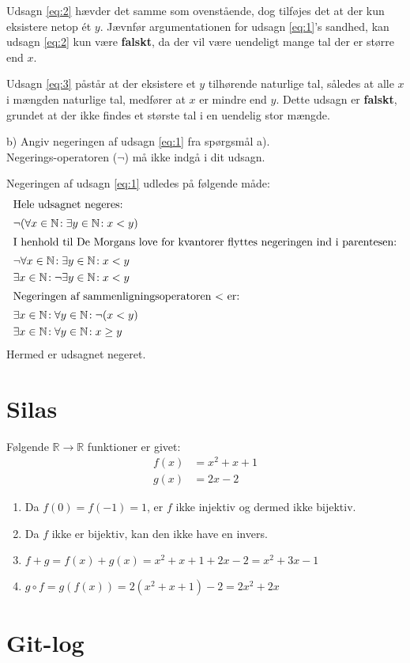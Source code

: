 \documentclass[12pt, a4paper]{article}
\begin{document}
Udsagn \eqref{eq:2} hævder det samme som ovenstående, dog tilføjes det at der kun eksistere netop ét \(y\). Jævnfør argumentationen for udsagn \eqref{eq:1}'s sandhed, kan udsagn \eqref{eq:2} kun være \textbf{falskt}, da der vil være uendeligt mange tal der er større end \(x\).

Udsagn \eqref{eq:3} påstår at der eksistere et \(y\) tilhørende naturlige tal, således at alle \(x\) i mængden naturlige tal, medfører at \(x\) er mindre end \(y\). Dette udsagn er \textbf{falskt}, grundet at der ikke findes et største tal i en uendelig stor mængde.
\begin{tcolorbox}
b) Angiv negeringen af udsagn \eqref{eq:1} fra spørgsmål a).\\ Negerings-operatoren (\(\neg\)) må ikke indgå i dit udsagn.
\end{tcolorbox}\vspace{-5pt}
Negeringen af udsagn \eqref{eq:1} udledes på følgende måde:\vspace{-5pt}
\begin{align}
\intertext{Hele udsagnet negeres:}
	&\neg(\forall x \in \mathbb{N}\! : \exists y \in \mathbb{N}\! : x < y)\\
\intertext{I henhold til De Morgans love for kvantorer flyttes negeringen ind i parentesen:}
	&\neg\forall x \in \mathbb{N}\! : \exists y \in \mathbb{N}\! : x < y\\
	&\exists x \in \mathbb{N}\! : \neg\exists y \in \mathbb{N}\! : x < y\\
\intertext{Negeringen af sammenligningsoperatoren $<$ er:}
	&\exists x \in \mathbb{N}\! : \forall y \in \mathbb{N}\! : \neg(x < y)\\
	&\exists x \in \mathbb{N}\! : \forall y \in \mathbb{N}\! : x \geq y
\end{align}
Hermed er udsagnet negeret.
\newpage

\section{Silas}
Følgende $\mathbb{R} \rightarrow \mathbb{R}$ funktioner er givet:
\begin{align*}
	f(x) & = x^2+x+1 \\
	g(x) & = 2x -2
\end{align*}
\begin{enumerate}[label=\alph*)]
	\item {
		Da $f(0)=f(-1)=1$, er $f$ ikke injektiv og dermed ikke bijektiv.
	}
	\item {
		Da $f$ ikke er bijektiv, kan den ikke have en invers.
	}
	\item {
		$f+g=f(x)+g(x)=x^2+x+1+2x-2=x^2+3x-1$
	}
	\item {
		$g\circ f=g(f(x))=2(x^2+x+1)-2=2x^2+2x$
	}
\end{enumerate}

\newpage
\section{Git-log}
\inputminted{bash}{git-log.txt}
\end{document}
